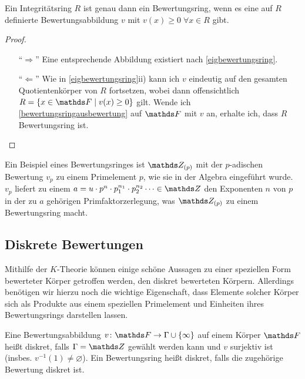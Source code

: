 \documentclass[ngerman,fontsize=11pt, paper=a4, parskip=half, titlepage=true, toc=bib]{scrartcl}
\begin{document}
\begin{Kor}
  Ein Integritätsring $R$ ist genau dann ein Bewertungsring, wenn es
  eine auf $R$ definierte Bewertungsabbildung $v$ mit $v(x)\geq
  0\;\forall x\in R$ gibt.
  \begin{proof}
    \begin{itemize}
    \item[\enquote{$\Rightarrow$}] Eine entsprechende Abbildung
      existiert nach \ref{eigbewertungsring}.
    \item[\enquote{$\Leftarrow$}] Wie in \ref{eigbewertungsring}ii)
      kann ich $v$ eindeutig auf den gesamten Quotientenkörper von
      $R$ fortsetzen, wobei dann offensichtlich $R=\{x\in\F\mid
      v(x)\geq 0\}$ gilt. Wende ich \ref{bewertungsringausbewertung}
      auf $\F$ mit $v$ an, erhalte ich, dass $R$ Bewertungsring ist.
    \end{itemize}
  \end{proof}
\end{Kor}

\begin{Bsp}
  Ein Beispiel eines Bewertungsringes ist $\Z_{(p)}$ mit der $p$-adischen
  Bewertung $v_p$ zu einem Primelement $p$, 
  wie sie in der Algebra eingeführt wurde.
  $v_p$ liefert zu einem 
  $a=u\cdot p^{n}\cdot p_1^{n_1}\cdot p_2^{n_2}\dotsm\in\Z $ 
  den Exponenten $n$ von $p$ in der zu $a$ gehörigen Primfaktorzerlegung,
  was $\Z_{(p)}$ zu einem Bewertungsring macht.
\end{Bsp}

\subsection{Diskrete Bewertungen}
Mithilfe der $K$-Theorie können einige schöne Aussagen zu einer
speziellen Form bewerteter Körper getroffen werden, den diskret
bewerteten Körpern. Allerdings benötigen wir hierzu noch die wichtige
Eigenschaft, dass Elemente solcher Körper sich als Produkte aus einem speziellen
Primelement und Einheiten ihres Bewertungsrings darstellen lassen.

\begin{Def}
  Eine Bewertungsabbildung $v\colon\F\to\Gamma\cup\{\infty\}$
  auf einem Körper $\F$ heißt diskret, falls $\Gamma=\Z$ gewählt
  werden kann und $v$ surjektiv ist (insbes. $v^{-1}(1)\neq \varnothing$).
  Ein Bewertungsring heißt diskret, falls die zugehörige Bewertung
  diskret ist.
\end{Def}
\end{document}
